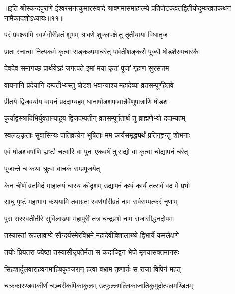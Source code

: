 {॥इति श्रीस्कन्दपुराणे ईश्वरसनत्कुमारसंवादे श्रावणमासमाहात्म्ये प्रतिपोटकव्रतद्वितीयोदुम्बरव्रतकथनं नामैकादशोऽध्यायः॥११॥}





\twolineshloka
{परं प्रवक्ष्यामि स्वर्णगौरीव्रतं शुभम्}
{श्रावणे शुक्लपक्षे तु तृतीयायां विधातृज} %

\twolineshloka
{प्रातः स्नात्वा नित्यकर्म कृत्वा सङ्कल्पमाचरेत्}
{पार्वतीशङ्करौ पूज्यौ षोडशैरुपचारकैः} %

\twolineshloka
{देवदेव समागच्छ प्रार्थयेऽहं जगत्पते}
{इमां मया कृतां पूजां गृहाण सुरसत्तम} %

\twolineshloka
{वायनानि प्रदेयानि दम्पतीभ्यस्तु षोडश}
{भवान्याश्च महादेव्या व्रतसम्पूर्णहेतवे} %

\twolineshloka
{प्रीतये द्विजवर्याय वायनं प्रददाम्यहम्}
{धानाषोडशपक्वान्नैर्वेणुपात्राणि षोडश} %

\twolineshloka
{कुर्याद्वस्त्रादिभिर्युक्तान्याहूय द्विजदम्पतीन्}
{व्रतसम्पूर्णतार्थं तु ब्राह्मणेभ्यो ददाम्यहम्} %

\twolineshloka
{स्वलङ्कृताः सुवासिन्यः पातिव्रत्येन भूषिताः}
{मम कार्यसमृद्ध्यर्थं प्रतिगृह्णन्तु शोभनाः} %

\twolineshloka
{एवं षोडशवर्षाणि ह्यष्टौ चत्वारि वा पुनः}
{एकवर्षं तु सद्यो वा कृत्वा चोद्यापनं चरेत्} %

\onelineshloka
{पूजान्ते च कथां श्रुत्वा वाचकं सम्प्रपूजयेत्} %


\twolineshloka
{केन चीर्णं व्रतमिदं माहात्म्यं चास्य कीदृशम्}
{उद्यापनं कथं कार्यं तत्सर्वं वद मे प्रभो} %


\twolineshloka
{साधु पृष्टं महाभाग कथयामि तवाग्रतः}
{स्वर्णगौरीव्रतं नाम सर्वसम्पत्करं नृणाम् } %

\twolineshloka
{पुरा सरस्वतीतीरे सुविलाख्या महापुरी}
{तत्र चन्द्रप्रभो नाम राजासीद्धनदोपमः} %

\twolineshloka
{तस्यास्तां रूपलावण्ये सौन्दर्यस्मेरविभ्रमे}
{महादेवीविशालाख्ये द्विभार्ये कमलेक्षणे } %

\twolineshloka
{तयोः प्रियतरा ज्येष्ठा तस्यासीन्नृपतेर्मता}
{स कदाचिद्वनं भेजे मृगयासक्तमानसः} %

\twolineshloka
{सिंहशार्दूलवाराहवनमाहिषकुञ्जरान्}
{हत्वा बभ्राम तृष्णार्तः स राजा विपिनं महत्} %

\twolineshloka
{चक्रकारण्डवाकीर्णं चञ्चरीकपिकाकुलम्}
{उत्फुल्लमल्लिकाजातिकुमुदोत्पलमण्डितम्} %

